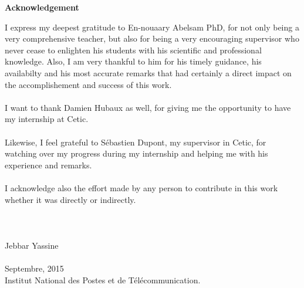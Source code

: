 \newenvironment{acknowledgements}%
    {\cleardoublepage\thispagestyle{plain}\null\vfill\begin{center}%
    \bfseries Acknowledgement\end{center}}%
    {\vfill\null}
\cleardoublepage
\setcounter{page}{2}
\begin{acknowledgements}
        
I express my deepest gratitude to En-nouaary Abelsam PhD, for not only being a very comprehensive teacher, but also for being a very encouraging supervisor who never cease to enlighten his students with his scientific and
professional knowledge. Also, I am very thankful to him for his timely guidance, his availabilty and his most accurate remarks that had certainly a direct impact on the accomplishement and success of this work. \\
\\
I want to thank Damien Hubaux as well, for giving me the opportunity to have my internship at Cetic.\\
\\
Likewise, I feel grateful to Sébastien Dupont, my supervisor in Cetic, for watching over my progress during my internship and helping me with his experience and remarks.\\ 
\\
I acknowledge also the effort made by any person to contribute in this work whether it was directly or indirectly.
\\
\\
\\ 
\\
Jebbar Yassine \\ 
\\
Septembre, 2015\\
{Institut National des Postes et de T\'el\'ecommunication. }\\
 \end{acknowledgements}
\newpage
